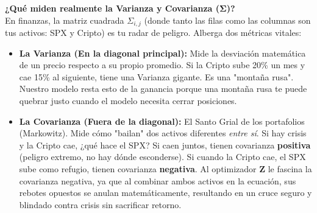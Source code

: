 \documentclass[11pt,a4paper]{article}
\begin{document}
\begin{itemize}
    \vspace{2mm}
    \textbf{¿Qué miden realmente la Varianza y Covarianza ($\boldsymbol{\Sigma}$)?}\\
    En finanzas, la matriz cuadrada $\Sigma_{i,j}$ (donde tanto las filas como las columnas son tus activos: SPX y Cripto) es tu radar de peligro. Alberga dos métricas vitales:
    \begin{itemize}
        \item \textbf{La Varianza (En la diagonal principal):} Mide la desviación matemática de un precio respecto a su propio promedio. Si la Cripto sube 20\% un mes y cae 15\% al siguiente, tiene una Varianza gigante. Es una "montaña rusa". Nuestro modelo resta esto de la ganancia porque una montaña rusa te puede quebrar justo cuando el modelo necesita cerrar posiciones.
        \item \textbf{La Covarianza (Fuera de la diagonal):} El Santo Grial de los portafolios (Markowitz). Mide cómo "bailan" dos activos diferentes \textit{entre sí}. Si hay crisis y la Cripto cae, ¿qué hace el SPX? Si caen juntos, tienen covarianza \textbf{positiva} (peligro extremo, no hay dónde esconderse). Si cuando la Cripto cae, el SPX sube como refugio, tienen covarianza \textbf{negativa}. Al optimizador \textbf{Z} le fascina la covarianza negativa, ya que al combinar ambos activos en la ecuación, sus rebotes opuestos se anulan matemáticamente, resultando en un cruce seguro y blindado contra crisis sin sacrificar retorno.
    \end{itemize}


\end{itemize}
\end{document}
